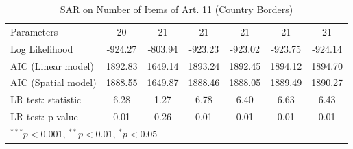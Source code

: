 \begin{table}[!h]
\begin{center}
\begin{tabular}{l c c c c c c }
Parameters              & 20           & 21           & 21           & 21           & 21           & 21           \\
Log Likelihood          & -924.27      & -803.94      & -923.23      & -923.02      & -923.75      & -924.14      \\
AIC (Linear model)      & 1892.83      & 1649.14      & 1893.24      & 1892.45      & 1894.12      & 1894.70      \\
AIC (Spatial model)     & 1888.55      & 1649.87      & 1888.46      & 1888.05      & 1889.49      & 1890.27      \\
LR test: statistic      & 6.28         & 1.27         & 6.78         & 6.40         & 6.63         & 6.43         \\
LR test: p-value        & 0.01         & 0.26         & 0.01         & 0.01         & 0.01         & 0.01         \\
\bottomrule
\multicolumn{7}{l}{\scriptsize{$^{***}p<0.001$, $^{**}p<0.01$, $^*p<0.05$}}
\end{tabular}
\caption{SAR on Number of Items of Art. 11 (Country Borders)}
\label{table:coefficients}
\end{center}
\end{table}
